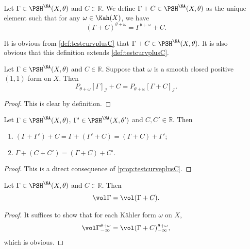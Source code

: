 \begin{definition}\label{def:NApotential:L341}
    Let $\Gamma\in \PSH^{\NA}(X,\theta)$ and $C\in \mathbb{R}$. We define $\Gamma+C\in \PSH^{\NA}(X,\theta)$ as the unique element such that for any $\omega\in \Kah(X)$, we have
    \[
    \left( \Gamma+C \right)^{\theta+\omega}=\Gamma^{\theta+\omega}+C.
    \]
\end{definition}
It is obvious from \cref{def:testcurvplusC} that $\Gamma+C\in \PSH^{\NA}(X,\theta)$. It is also obvious that this definition extends \cref{def:testcurvplusC}.

\begin{proposition}\label{prop:NApotential:L350}
    Let $\Gamma\in \PSH^{\NA}(X,\theta)$ and $C\in \mathbb{R}$. Suppose that $\omega$ is a smooth closed positive $(1,1)$-form on $X$. Then
    \[
    P_{\theta+\omega}[\Gamma]_{\mathcal{I}}+C=P_{\theta+\omega}[\Gamma+C]_{\mathcal{I}}.
    \]
\end{proposition}
\begin{proof}
    This is clear by definition.
\end{proof}

\begin{proposition}\label{prop:NAmetricplusC}
    Let $\Gamma\in \PSH^{\NA}(X,\theta)$, $\Gamma'\in \PSH^{\NA}(X,\theta')$ and $C,C'\in \mathbb{R}$. Then
    \begin{enumerate}
        \item\label{itm:prop:NAmetricplusC:1} $(\Gamma+\Gamma')+C=\Gamma+(\Gamma'+C)=(\Gamma+C)+\Gamma'$;
        \item\label{itm:prop:NAmetricplusC:2} $\Gamma+(C+C')=(\Gamma+C)+C'$.
    \end{enumerate}
\end{proposition}
\begin{proof}
    This is a direct consequence of \cref{prop:testcurveplusC}.
\end{proof}

\begin{proposition}\label{prop:vol_inv_plusC}
    Let $\Gamma\in \PSH^{\NA}(X,\theta)$ and $C\in \mathbb{R}$. Then
    \[
    \vol \Gamma=\vol (\Gamma+C).
    \]
\end{proposition}
\begin{proof}
    It suffices to show that for each Kähler form $\omega$ on $X$,
    \[
    \vol \Gamma^{\theta+\omega}_{-\infty}=\vol (\Gamma+C)^{\theta+\omega}_{-\infty},
    \]
    which is obvious.
\end{proof}

